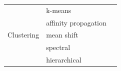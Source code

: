 \documentclass[twoside,11pt]{article}
\begin{document}
\begin{table}[hbtp]
{\begin{tabular}{lll}
  \multirow{5}{*}{Clustering} & k-means &  \citep{bishop2006pattern}\\
  & affinity propagation & \citep{frey2007clustering} \\
  & mean shift & \citep{comaniciu2002mean} \\
  & spectral & \citep{shi2000normalized} \\
  & hierarchical & \citep{friedman2001elements} \\

  \bottomrule
  \end{tabular}}
\end{table}


\vskip 0.2in

\end{document}
